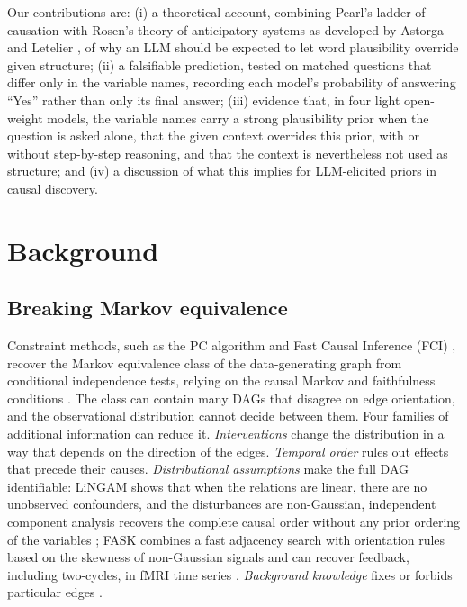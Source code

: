 \documentclass{llncs}
\begin{document}
Our contributions are: (i) a theoretical account, combining Pearl's ladder of causation \cite{pearl2009causality,pearl2018theoretical} with Rosen's theory of anticipatory systems \cite{rosen2012anticipatory} as developed by Astorga and Letelier \cite{astorga2026anticipation}, of why an LLM should be expected to let word plausibility override given structure; (ii) a falsifiable prediction, tested on matched questions that differ only in the variable names, recording each model's probability of answering ``Yes'' rather than only its final answer; (iii) evidence that, in four light open-weight models, the variable names carry a strong plausibility prior when the question is asked alone, that the given context overrides this prior, with or without step-by-step reasoning, and that the context is nevertheless not used as structure; and (iv) a discussion of what this implies for LLM-elicited priors in causal discovery.

\section{Background}
\label{sec:background}

\subsection{Breaking Markov equivalence}
\label{sec:mec}

Constraint methods, such as the PC algorithm and Fast Causal Inference (FCI) \cite{spirtes2000causation}, recover the Markov equivalence class of the data-generating graph from conditional independence tests, relying on the causal Markov and faithfulness conditions \cite{glymour2019review}. The class can contain many DAGs that disagree on edge orientation, and the observational distribution cannot decide between them. Four families of additional information can reduce it. \emph{Interventions} change the distribution in a way that depends on the direction of the edges. \emph{Temporal order} rules out effects that precede their causes. \emph{Distributional assumptions} make the full DAG identifiable: LiNGAM shows that when the relations are linear, there are no unobserved confounders, and the disturbances are non-Gaussian, independent component analysis recovers the complete causal order without any prior ordering of the variables \cite{shimizu2006linear}; FASK combines a fast adjacency search with orientation rules based on the skewness of non-Gaussian signals and can recover feedback, including two-cycles, in fMRI time series \cite{sanchez2019estimating}. \emph{Background knowledge} fixes or forbids particular edges \cite{spirtes2016causal,peters2017elements}.
\end{document}
